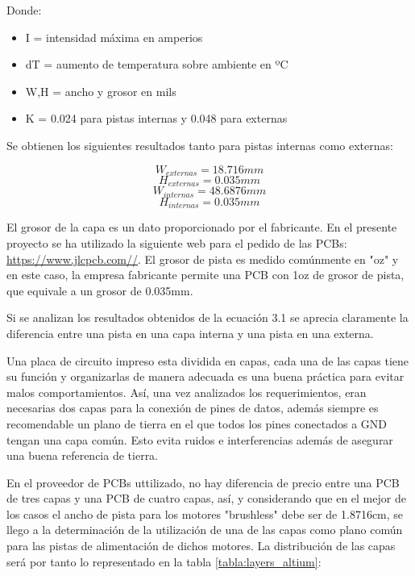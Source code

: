 Donde: 
\begin{itemize}
	\item I = intensidad máxima en amperios
	\item dT = aumento de temperatura sobre ambiente en ºC
	\item W,H = ancho y grosor en mils
	\item K = 0.024 para pistas internas y 0.048 para externas
\end{itemize}

Se obtienen los siguientes resultados tanto para pistas internas como externas: 

\begin{equation*}
W_{externas} = 18.716 mm 
\end{equation*} 
\begin{equation*}
H_{externas} = 	0.035 mm
\end{equation*}
\begin{equation*}
W_{internas} =  48.6876 mm 
\end{equation*} 
\begin{equation*}
H_{internas} = 	0.035 mm
\end{equation*}

El grosor de la capa es un dato proporcionado por el fabricante. En el presente proyecto se ha utilizado la siguiente web para el pedido de las PCBs: \url{https://www.jlcpcb.com//}. \newline 
El grosor de pista es medido comúnmente en "oz" y en este caso, la empresa fabricante permite una PCB con 1oz de grosor de pista, que equivale a un grosor de 0.035mm.\newline

Si se analizan los resultados obtenidos de la ecuación 3.1 se aprecia claramente la diferencia entre una pista en una capa interna y una pista en una externa. \newline

Una placa de circuito impreso esta dividida en capas, cada una de las capas tiene su función y organizarlas de manera adecuada es una buena práctica para evitar malos comportamientos. Así, una vez analizados los requerimientos, eran necesarias dos capas para la conexión de pines de datos, además siempre es recomendable un plano de tierra en el que todos los pines conectados a GND tengan una capa común. Esto evita ruidos e interferencias además de asegurar una buena referencia de tierra. \newline

En el proveedor de PCBs uttilizado, no hay diferencia de precio entre una PCB de tres capas y una PCB de cuatro capas, así, y considerando que en el mejor de los casos el ancho de pista para los motores "brushless" debe ser de 1.8716cm, se llego a la determinación de la utilización de una de las capas como plano común para las pistas de alimentación de dichos motores. La distribución de las capas será por tanto lo representado en la tabla \ref{tabla:layers_altium}: 

